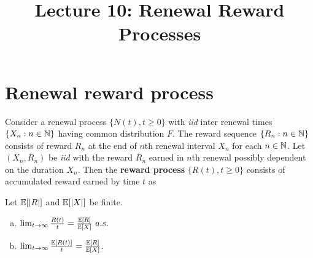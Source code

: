 \documentclass[a4paper,10pt,english]{article}
\title{Lecture 10: Renewal Reward Processes}
\author{}
\begin{document}
\maketitle
\section{Renewal reward process}
Consider a renewal process $\{N(t), t \geqslant 0\}$ with \textit{iid} inter renewal times $\{X_n: n \in \mathbb{N}\}$ having common distribution $F$.  
The reward sequence $\{R_n: n \in \mathbb{N}\}$ consists of reward $R_n$ at the end of $n$th renewal interval $X_n$ for each $n \in \mathbb{N}$. 
Let $(X_n,R_n)$ be \textit{iid} with the reward $R_n$ earned in $n$th renewal possibly dependent on the duration $X_n$. 
Then the \textbf{reward process} $\{R(t), t \geqslant 0\}$ consists of accumulated reward earned by time $t$ as 
\begin{thm}
	\label{theorem}
Let $\mathbb{E}[|R|]$ and $\mathbb{E}[|X|]$ be finite.
\begin{enumerate}[(a)]
\item\label{item:Basic} $\lim_{t \to \infty} \frac{R(t)}{t} = \frac{\mathbb{E}[R]}{\mathbb{E}[X]} ~a.s.$
\item\label{item:Elem}  $\lim_{t \to \infty} \frac{\mathbb{E}[R(t)]}{t} = \frac{\mathbb{E}[R]}{\mathbb{E}[X]}$.
\end{enumerate}
\end{thm}
\end{document}
